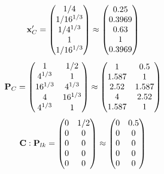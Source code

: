 \documentclass[10pt,a4paper]{article}
\begin{document}
	\[
		\bold{x}'_{C} = 
		\begin{pmatrix}
			{1} / {{4}} \\
			{1} / {{16^ {1 / 3}}} \\
			{1} / {{4^ {1 / 3}}} \\
			{1}{} \\
			{1} / {{16^ {1 / 3}}} \\
		\end{pmatrix}
		\approx
		\begin{pmatrix}
			0.25     \\
			0.3969   \\
			0.63     \\
			1        \\
			0.3969   \\
		\end{pmatrix}
	\]
	\[
		\bold{P}_{C} = 
		\begin{pmatrix}
			{1}{} & {1} / {{2}} \\
			{{4^ {1 / 3}}}{} & {1}{} \\
			{{16^ {1 / 3}}}{} & {{4^ {1 / 3}}}{} \\
			{{4}}{} & {{16^ {1 / 3}}}{} \\
			{{4^ {1 / 3}}}{} & {1}{} \\
		\end{pmatrix}
		\approx
		\begin{pmatrix}
			1        & 0.5      \\
			1.587    & 1        \\
			2.52     & 1.587    \\
			4        & 2.52     \\
			1.587    & 1        \\
		\end{pmatrix}
	\]
	\[
		\bold{C}: \bold{P}_{lk} = 
		\begin{pmatrix}
			{{0}}{} & {1} / {{2}} \\
			{{0}}{} & {{0}}{} \\
			{{0}}{} & {{0}}{} \\
			{{0}}{} & {{0}}{} \\
			{{0}}{} & {{0}}{} \\
		\end{pmatrix}
		\approx
		\begin{pmatrix}
			0        & 0.5      \\
			0        & 0        \\
			0        & 0        \\
			0        & 0        \\
			0        & 0        \\
		\end{pmatrix}
	\]
\end{document}
